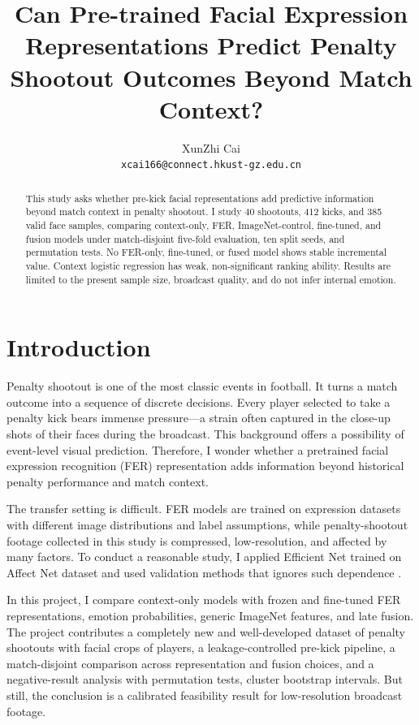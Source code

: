 \documentclass{article}
\title{Can Pre-trained Facial Expression Representations Predict Penalty Shootout Outcomes Beyond Match Context?}
\author{%
  XunZhi Cai \\
  \texttt{xcai166@connect.hkust-gz.edu.cn}
}
\begin{document}
\maketitle

\begin{abstract}
This study asks whether pre-kick facial representations add predictive information beyond match context in penalty shootout. I study 40 shootouts, 412 kicks, and 385 valid face samples, comparing context-only, FER, ImageNet-control, fine-tuned, and fusion models under match-disjoint five-fold evaluation, ten split seeds, and permutation tests. No FER-only, fine-tuned, or fused model shows stable incremental value. Context logistic regression has weak, non-significant ranking ability. Results are limited to the present sample size, broadcast quality, and do not infer internal emotion.
\end{abstract}

\section{Introduction}

Penalty shootout is one of the most classic events in football. It turns a match outcome into a sequence of discrete decisions. Every player selected to take a penalty kick bears immense pressure—a strain often captured in the close-up shots of their faces during the broadcast. This background offers a possibility of event-level visual prediction. Therefore, I wonder whether a pretrained facial expression recognition (FER) representation adds information beyond historical penalty performance and match context.

The transfer setting is difficult. FER models are trained on expression datasets with different image distributions and label assumptions, while penalty-shootout footage collected in this study is compressed, low-resolution, and affected by many factors. To conduct a reasonable study, I applied Efficient Net trained on Affect Net dataset and used validation methods that ignores such dependence \citep{mollahosseini2019,tan2019,roberts2017,varma2006}.

In this project, I compare context-only models with frozen and fine-tuned FER representations, emotion probabilities, generic ImageNet features, and late fusion. The project contributes a completely new and well-developed dataset of penalty shootouts with facial crops of players, a leakage-controlled pre-kick pipeline, a match-disjoint comparison across representation and fusion choices, and a negative-result analysis with permutation tests, cluster bootstrap intervals. But still, the conclusion is a calibrated feasibility result for low-resolution broadcast footage.
\end{document}
